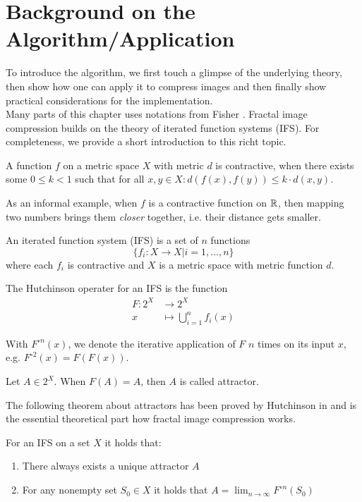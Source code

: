 \section{Background on the Algorithm/Application}\label{sec:background}
To introduce the algorithm, we first touch a glimpse of the underlying theory, then show how one can apply
it to compress images and then finally show practical considerations for the implementation. \\
Many parts of this chapter uses notations from Fisher \cite{fisher2012}.
Fractal image compression builds on the theory of iterated function systems (IFS). For completeness,
we provide a short introduction to this richt topic.
\begin{definition}
    A function $f$ on a metric space $X$ with metric $d$ is contractive, when there exists some $0 \leq k < 1$
    such that for all $x,y \in X: d(f(x), f(y)) \leq k \cdot d(x,y)$.
\end{definition}
As an informal example, when $f$ is a contractive function on $\mathbb{R}$, then mapping two numbers brings them \textit{closer} together,
i.e. their distance gets smaller.
\begin{definition}
    An iterated function system (IFS) is a set of $n$ functions $$\{f_i:X \to X | i=1,...,n\}$$
    where each $f_i$ is contractive and $X$ is a metric space with metric function $d$.
\end{definition}
\begin{definition}
    The Hutchinson operater for an IFS is the function
    \begin{align*}
        F \colon 2^X &\to 2^X\\
        x &\mapsto \bigcup_{i=1}^n f_i(x)
    \end{align*}
\end{definition}
With $F^{\circ n}(x)$, we denote the iterative application of $F$ $n$ times on its input $x$, e.g. $F^{\circ 2}(x) = F(F(x))$.
\begin{definition}
    Let $A \in 2^X$. When $F(A)=A$, then $A$ is called attractor.
\end{definition}
The following theorem about attractors has been proved by Hutchinson in \cite{hutchinson1981fractals} and is
the essential theoretical part how fractal image compression works.
\begin{theorem}\label{theorem-fixpoint}
    For an IFS on a set $X$ it holds that:
    \begin{enumerate}
        \item There always exists a unique attractor $A$
        \item For any nonempty set $S_0 \in X$ it holds that $A = \lim_{n \to \infty} F^{\circ n}(S_0)$
    \end{enumerate}
\end{theorem}
